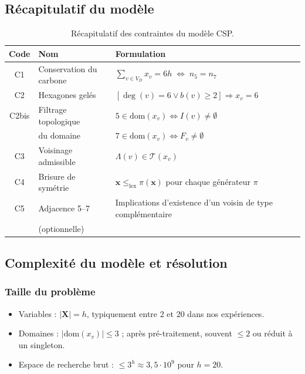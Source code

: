 \documentclass[12pt,a4paper]{article}
\theoremstyle{definition}
\theoremstyle{remark}
\newcommand{\VD}{V_{\!D}}
\newcommand{\xv}{x_v}
\newcommand{\degv}{\deg(v)}
\newcommand{\ncinq}{n_5}
\newcommand{\nsept}{n_7}
\newcommand{\dom}{\mathrm{dom}}
\begin{document}
\subsection{R\'ecapitulatif du mod\`ele}

\begin{table}[!ht]
\centering
\renewcommand{\arraystretch}{1.4}
\begin{tabular}{@{}cll@{}}
\toprule
\textbf{Code} & \textbf{Nom} & \textbf{Formulation} \\
\midrule
C1 & Conservation du carbone &
  $\sum_{v \in \VD} \xv = 6h \;\Leftrightarrow\; \ncinq = \nsept$ \\
C2 & Hexagones gel\'es &
  $[\degv = 6 \lor b(v) \geq 2] \Rightarrow \xv = 6$ \\
C2bis & Filtrage topologique &
  $5 \in \dom(\xv) \Leftrightarrow I(v) \neq \emptyset$ \\
   & du domaine &
  $7 \in \dom(\xv) \Leftrightarrow F_v \neq \emptyset$ \\
C3 & Voisinage admissible &
  $\Lambda(v) \in \mathcal{T}(\xv)$ \\
C4 & Brisure de sym\'etrie &
  $\mathbf{x} \leq_{\mathrm{lex}} \pi(\mathbf{x})$ pour chaque g\'en\'erateur $\pi$ \\
C5 & Adjacence 5--7 &
  Implications d'existence d'un voisin de type compl\'ementaire \\
   & (optionnelle) & \\
\bottomrule
\end{tabular}
\caption{R\'ecapitulatif des contraintes du mod\`ele CSP.}
\label{tab:contraintes}
\end{table}

\subsection{Complexit\'e du mod\`ele et r\'esolution}

\subsubsection{Taille du probl\`eme}

\begin{itemize}
  \item Variables : $|\mathbf{X}| = h$, typiquement entre 2 et 20 dans
        nos exp\'eriences.
  \item Domaines : $|\dom(\xv)| \leq 3$ ; apr\`es pr\'e-traitement,
        souvent $\leq 2$ ou r\'eduit \`a un singleton.
  \item Espace de recherche brut : $\leq 3^h \approx 3{,}5 \cdot 10^9$
        pour $h = 20$.
\end{itemize}
\end{document}
